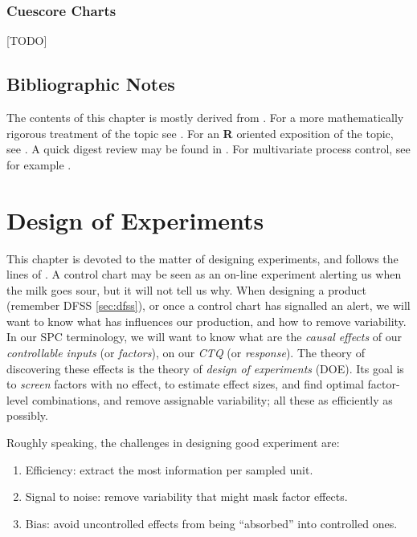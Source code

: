 \documentclass[12pt,a4paper]{report}
\theoremstyle{plain}
\theoremstyle{definition}
\newcommand{\R}{\textnormal{\sffamily\bfseries R }}
\begin{document}
\subsection{Cuescore Charts}
[TODO]



\section{Bibliographic Notes}
The contents of this chapter is mostly derived from \cite{montgomery_introduction_2007}. 
For a more mathematically rigorous treatment of the topic see \cite{basseville_detection_1993}.
For an \R oriented exposition of the topic, see \cite{qiu_introduction_2013}.
A quick digest review may be found in \cite{natrella_nist/sematech_2010}.
For multivariate process control, see for example \cite{ge_multivariate_2012}. 



\chapter{Design of Experiments}

This chapter is devoted to the matter of designing experiments, and follows the lines of \cite{cox_theory_2000}.
A control chart may be seen as an on-line experiment alerting us when the milk goes sour, but it will not tell us why. 
When designing a product (remember DFSS \ref{sec:dfss}), or once a control chart has signalled an alert, we will want to know what has influences our production, and how to remove variability.
In our SPC terminology, we will want to know what are the \emph{causal} \emph{effects} of our \emph{controllable inputs} (or \emph{factors}), on our \emph{CTQ} (or \emph{response}). 
The theory of discovering these effects is the theory of \emph{design of experiments} (DOE).
Its goal is to \emph{screen} factors with no effect, to estimate effect sizes, and find optimal factor-level combinations, and remove assignable variability; all these as efficiently as possibly.



Roughly speaking, the challenges in designing good experiment are:
\begin{enumerate}
\item Efficiency: extract the most information per sampled unit.
\item Signal to noise: remove variability that might mask factor effects.
\item Bias: avoid uncontrolled effects from being ``absorbed'' into controlled ones.
\end{enumerate}
\end{document}

